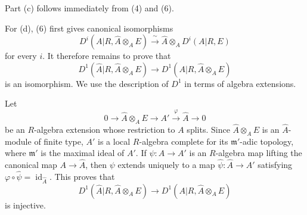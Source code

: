 Part (c) follows immediately from (4) and (6).


For (d), (6) first gives canonical isomorphisms
\[
 D^i(A|R,\widehat A\otimes_AE)
 \xrightarrow{\ \sim\ }
 \widehat A\otimes_AD^i(A|R,E)
\]
for every $i$. It therefore remains to prove that
\[
 D^1(\widehat A|R,\widehat A\otimes_AE)
 \longrightarrow D^1(A|R,\widehat A\otimes_AE)
\]
is an isomorphism. We use the description of $D^1$ in terms of
algebra extensions.

Let
\[
 0\longrightarrow\widehat A\otimes_AE\longrightarrow A'
 \xrightarrow{\ \varphi\ }\widehat A\longrightarrow0
\]
be an $R$-algebra extension whose restriction to $A$ splits. Since
$\widehat A\otimes_AE$ is an $\widehat A$-module of finite type,
$A'$ is a local $R$-algebra complete for its $\mathfrak m'$-adic
topology, where $\mathfrak m'$ is the maximal ideal of $A'$. If
$\psi:A\longrightarrow A'$ is an $R$-algebra map lifting the
canonical map $A\longrightarrow\widehat A$, then $\psi$ extends
uniquely to a map
$\widehat\psi:\widehat A\longrightarrow A'$ satisfying
$\varphi\circ\widehat\psi=\operatorname{id}_{\widehat A}$.
This proves that
\[
 D^1(\widehat A|R,\widehat A\otimes_AE)
 \longrightarrow D^1(A|R,\widehat A\otimes_AE)
\]
is injective.


